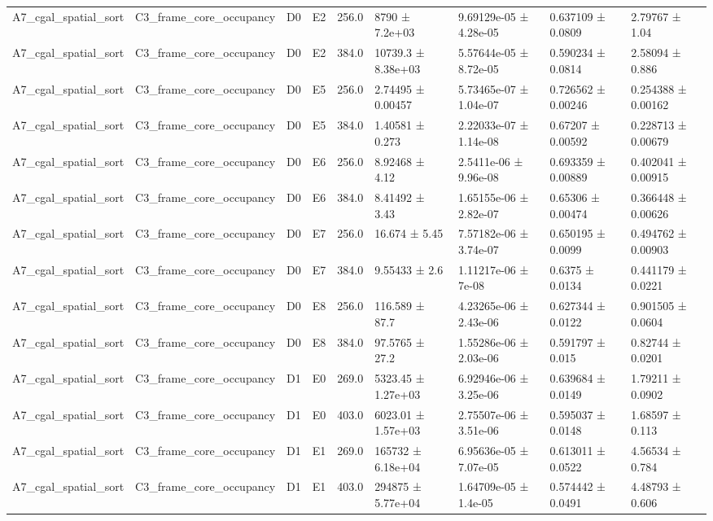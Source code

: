 \begin{table}
\begin{tabular}{lllllllll}
A7\_cgal\_spatial\_sort & C3\_frame\_core\_occupancy & D0 & E2 & 256.0 & 8790 ± 7.2e+03 & 9.69129e-05 ± 4.28e-05 & 0.637109 ± 0.0809 & 2.79767 ± 1.04 \\
A7\_cgal\_spatial\_sort & C3\_frame\_core\_occupancy & D0 & E2 & 384.0 & 10739.3 ± 8.38e+03 & 5.57644e-05 ± 8.72e-05 & 0.590234 ± 0.0814 & 2.58094 ± 0.886 \\
A7\_cgal\_spatial\_sort & C3\_frame\_core\_occupancy & D0 & E5 & 256.0 & 2.74495 ± 0.00457 & 5.73465e-07 ± 1.04e-07 & 0.726562 ± 0.00246 & 0.254388 ± 0.00162 \\
A7\_cgal\_spatial\_sort & C3\_frame\_core\_occupancy & D0 & E5 & 384.0 & 1.40581 ± 0.273 & 2.22033e-07 ± 1.14e-08 & 0.67207 ± 0.00592 & 0.228713 ± 0.00679 \\
A7\_cgal\_spatial\_sort & C3\_frame\_core\_occupancy & D0 & E6 & 256.0 & 8.92468 ± 4.12 & 2.5411e-06 ± 9.96e-08 & 0.693359 ± 0.00889 & 0.402041 ± 0.00915 \\
A7\_cgal\_spatial\_sort & C3\_frame\_core\_occupancy & D0 & E6 & 384.0 & 8.41492 ± 3.43 & 1.65155e-06 ± 2.82e-07 & 0.65306 ± 0.00474 & 0.366448 ± 0.00626 \\
A7\_cgal\_spatial\_sort & C3\_frame\_core\_occupancy & D0 & E7 & 256.0 & 16.674 ± 5.45 & 7.57182e-06 ± 3.74e-07 & 0.650195 ± 0.0099 & 0.494762 ± 0.00903 \\
A7\_cgal\_spatial\_sort & C3\_frame\_core\_occupancy & D0 & E7 & 384.0 & 9.55433 ± 2.6 & 1.11217e-06 ± 7e-08 & 0.6375 ± 0.0134 & 0.441179 ± 0.0221 \\
A7\_cgal\_spatial\_sort & C3\_frame\_core\_occupancy & D0 & E8 & 256.0 & 116.589 ± 87.7 & 4.23265e-06 ± 2.43e-06 & 0.627344 ± 0.0122 & 0.901505 ± 0.0604 \\
A7\_cgal\_spatial\_sort & C3\_frame\_core\_occupancy & D0 & E8 & 384.0 & 97.5765 ± 27.2 & 1.55286e-06 ± 2.03e-06 & 0.591797 ± 0.015 & 0.82744 ± 0.0201 \\
A7\_cgal\_spatial\_sort & C3\_frame\_core\_occupancy & D1 & E0 & 269.0 & 5323.45 ± 1.27e+03 & 6.92946e-06 ± 3.25e-06 & 0.639684 ± 0.0149 & 1.79211 ± 0.0902 \\
A7\_cgal\_spatial\_sort & C3\_frame\_core\_occupancy & D1 & E0 & 403.0 & 6023.01 ± 1.57e+03 & 2.75507e-06 ± 3.51e-06 & 0.595037 ± 0.0148 & 1.68597 ± 0.113 \\
A7\_cgal\_spatial\_sort & C3\_frame\_core\_occupancy & D1 & E1 & 269.0 & 165732 ± 6.18e+04 & 6.95636e-05 ± 7.07e-05 & 0.613011 ± 0.0522 & 4.56534 ± 0.784 \\
A7\_cgal\_spatial\_sort & C3\_frame\_core\_occupancy & D1 & E1 & 403.0 & 294875 ± 5.77e+04 & 1.64709e-05 ± 1.4e-05 & 0.574442 ± 0.0491 & 4.48793 ± 0.606 \\

\end{tabular}
\end{table}
